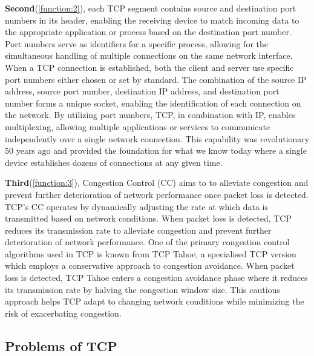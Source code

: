 \textbf{Second}(\ref{function:2}), each TCP segment contains source and destination port numbers in its header, enabling the
receiving device to match incoming data to the appropriate application or process based on the destination port number. Port
numbers serve as identifiers for a specific process, allowing for the simultaneous handling of multiple connections
on the same network interface. When a TCP connection is established, both the client and server use specific port numbers
either chosen or set by standard. The combination of the source IP address, source port number, destination IP address, and destination
port number forms a unique socket, enabling the identification of each connection on the network. By utilizing port numbers,
TCP, in combination with IP, enables multiplexing, allowing multiple applications or services to communicate independently over
a single network connection. This capability was revolutionary 50 years ago and provided the foundation for what we know today
where a single device establishes dozens of connections at any given time.

\textbf{Third}(\ref{function:3}), Congestion Control (CC) aims to to alleviate congestion and prevent further deterioration
of network performance once packet loss is detected. TCP's CC operates by dynamically adjusting the rate
at which data is transmitted based on network conditions. When packet loss is detected, TCP reduces its transmission rate to
alleviate congestion and prevent further deterioration of network performance. One of the primary congestion control algorithms
used in TCP is known from TCP Tahoe, a specialised TCP version which employs a conservative approach to congestion avoidance.
When packet loss is detected, TCP Tahoe enters a congestion avoidance phase where it reduces its transmission rate by halving
the congestion window size. This cautious approach helps TCP adapt to changing network conditions while minimizing the risk of
exacerbating congestion.

\subsection{Problems of TCP}

